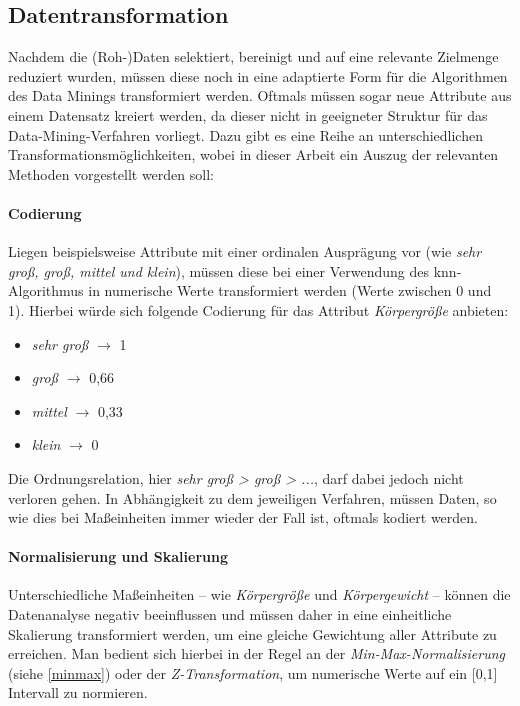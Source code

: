 \subsection{Datentransformation}
\label{dt}
Nachdem die (Roh-)Daten selektiert, bereinigt und auf eine relevante Zielmenge reduziert wurden, müssen diese noch in eine adaptierte Form für die Algorithmen des Data Minings transformiert werden. Oftmals müssen sogar neue Attribute aus einem Datensatz kreiert werden, da dieser nicht in geeigneter Struktur für das Data-Mining-Verfahren vorliegt. Dazu gibt es eine Reihe an unterschiedlichen Transformationsmöglichkeiten, wobei in dieser Arbeit ein Auszug der relevanten Methoden vorgestellt werden soll:

\paragraph{Codierung}
Liegen beispielsweise Attribute mit einer ordinalen Ausprägung vor (wie \textit{sehr groß, groß, mittel und klein}), müssen diese bei einer Verwendung des \gls{knn}-Algorithmus in numerische Werte transformiert werden (Werte zwischen 0 und 1). Hierbei würde sich folgende Codierung für das Attribut \textit{Körpergröße} anbieten:

\begin{itemize}
\item \textit{sehr groß} $\rightarrow$ 1
\item \textit{groß} $\rightarrow$ 0,66
\item \textit{mittel} $\rightarrow$ 0,33
\item \textit{klein} $\rightarrow$ 0
\end{itemize}

Die Ordnungsrelation, hier \textit{sehr groß > groß > ...}, darf dabei jedoch nicht verloren gehen. In Abhängigkeit zu dem jeweiligen Verfahren, müssen Daten, so wie dies bei Maßeinheiten immer wieder der Fall ist, oftmals kodiert werden.

\paragraph{Normalisierung und Skalierung}
Unterschiedliche Maßeinheiten -- wie \textit{Körpergröße} und \textit{Körpergewicht} -- können die Datenanalyse negativ beeinflussen und müssen daher in eine einheitliche Skalierung transformiert werden, um eine gleiche Gewichtung aller Attribute zu erreichen. Man bedient sich hierbei in der Regel an der \textit{Min-Max-Normalisierung} (siehe \vref{minmax}) oder der \textit{Z-Transformation}, um numerische Werte auf ein [0,1] Intervall zu normieren.

